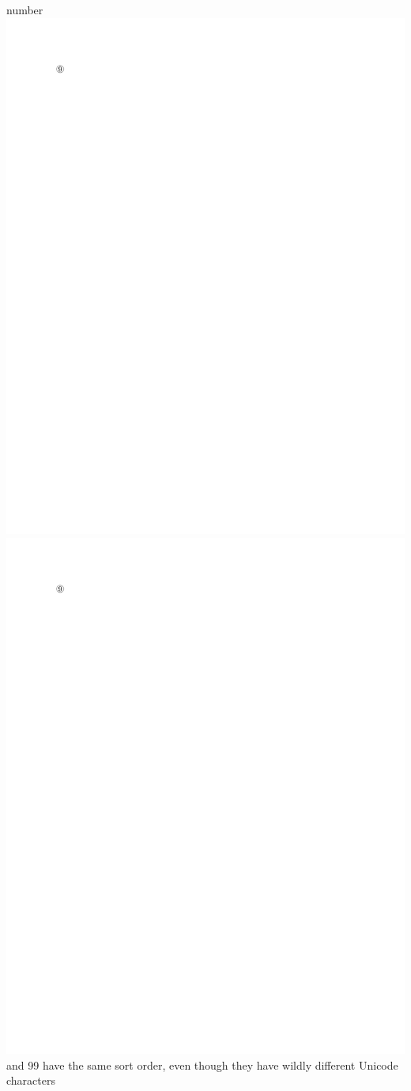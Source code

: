 \begin{description}
number \includegraphics{uni/unicode_2468}\includegraphics{uni/unicode_2468} and 99 have the same sort order, even though they have
wildly different Unicode characters
 

\end{description}
